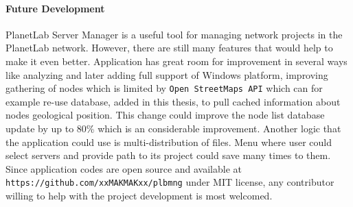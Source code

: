 \paragraph{Future Development}
PlanetLab Server Manager is a useful tool for managing network projects in the PlanetLab network. However, there are still many features that would help to make it even better. Application has great room for improvement in several ways like analyzing and later adding full support of Windows platform, improving gathering of nodes which is limited by \texttt{Open StreetMaps API} which can for example re-use database, added in this thesis, to pull cached information about nodes geological position. This change could improve the node list database update by up to 80\% which is an considerable improvement. Another logic that the application could use is multi-distribution of files. Menu where user could select servers and provide path to its project could save many times to them. Since application codes are open source and available at \texttt{https://github.com/xxMAKMAKxx/plbmng} under MIT license, any contributor willing to help with the project development is most welcomed.